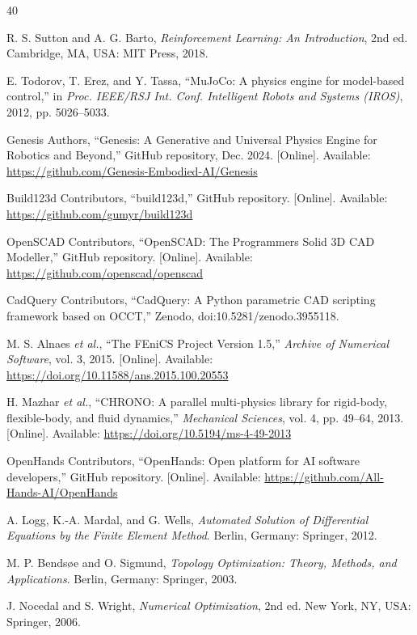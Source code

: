 \documentclass[conference]{IEEEtran}
\begin{document}
\begin{thebibliography}{40}

R. S. Sutton and A. G. Barto, \emph{Reinforcement Learning: An Introduction}, 2nd ed. Cambridge, MA, USA: MIT Press, 2018.

E. Todorov, T. Erez, and Y. Tassa, ``MuJoCo: A physics engine for model-based control,'' in \emph{Proc. IEEE/RSJ Int. Conf. Intelligent Robots and Systems (IROS)}, 2012, pp. 5026--5033.

Genesis Authors, ``Genesis: A Generative and Universal Physics Engine for Robotics and Beyond,'' GitHub repository, Dec. 2024. [Online]. Available: \url{https://github.com/Genesis-Embodied-AI/Genesis}

Build123d Contributors, ``build123d,'' GitHub repository. [Online]. Available: \url{https://github.com/gumyr/build123d}

OpenSCAD Contributors, ``OpenSCAD: The Programmers Solid 3D CAD Modeller,'' GitHub repository. [Online]. Available: \url{https://github.com/openscad/openscad}

CadQuery Contributors, ``CadQuery: A Python parametric CAD scripting framework based on OCCT,'' Zenodo, doi:10.5281/zenodo.3955118.

M. S. Alnaes \emph{et al.}, ``The FEniCS Project Version 1.5,'' \emph{Archive of Numerical Software}, vol. 3, 2015. [Online]. Available: \url{https://doi.org/10.11588/ans.2015.100.20553}

H. Mazhar \emph{et al.}, ``CHRONO: A parallel multi-physics library for rigid-body, flexible-body, and fluid dynamics,'' \emph{Mechanical Sciences}, vol. 4, pp. 49--64, 2013. [Online]. Available: \url{https://doi.org/10.5194/ms-4-49-2013}

OpenHands Contributors, ``OpenHands: Open platform for AI software developers,'' GitHub repository. [Online]. Available: \url{https://github.com/All-Hands-AI/OpenHands}

A. Logg, K.-A. Mardal, and G. Wells, \emph{Automated Solution of Differential Equations by the Finite Element Method}. Berlin, Germany: Springer, 2012.

M. P. Bendsøe and O. Sigmund, \emph{Topology Optimization: Theory, Methods, and Applications}. Berlin, Germany: Springer, 2003.

J. Nocedal and S. Wright, \emph{Numerical Optimization}, 2nd ed. New York, NY, USA: Springer, 2006.


\end{thebibliography}
\end{document}
